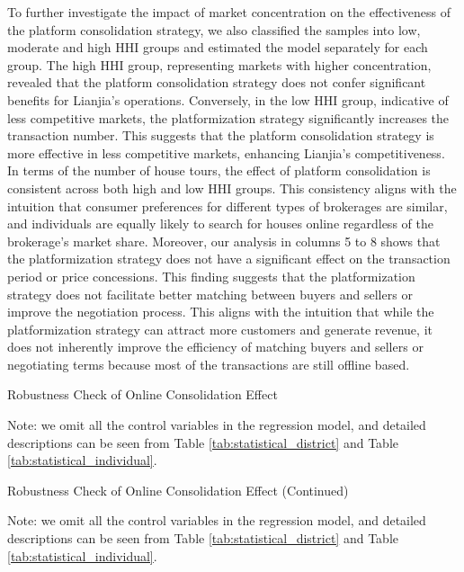 \documentclass[11pt]{article}
\begin{document}
To further investigate the impact of market concentration on the effectiveness of the platform consolidation strategy, we also classified the samples into low, moderate and high HHI groups and estimated the model separately for each group. The high HHI group, representing markets with higher concentration, revealed that the platform consolidation strategy does not confer significant benefits for Lianjia's operations. Conversely, in the low HHI group, indicative of less competitive markets, the platformization strategy significantly increases the transaction number. This suggests that the platform consolidation strategy is more effective in less competitive markets, enhancing Lianjia's competitiveness. In terms of the number of house tours, the effect of platform consolidation is consistent across both high and low HHI groups. This consistency aligns with the intuition that consumer preferences for different types of brokerages are similar, and individuals are equally likely to search for houses online regardless of the brokerage's market share. Moreover, our analysis in columns 5 to 8 shows that the platformization strategy does not have a significant effect on the transaction period or price concessions. This finding suggests that the platformization strategy does not facilitate better matching between buyers and sellers or improve the negotiation process. This aligns with the intuition that while the platformization strategy can attract more customers and generate revenue, it does not inherently improve the efficiency of matching buyers and sellers or negotiating terms because most of the transactions are still offline based.

\begin{table}
  \begin{center}
    \begin{scriptsize}
      \caption{Robustness Check of Online Consolidation Effect}
      \label{tab:heter_platform_did}
      
    
    Note: we omit all the control variables in the regression model, and detailed descriptions can be seen from Table \ref{tab:statistical_district} and Table \ref{tab:statistical_individual}.
    \end{scriptsize}
  \end{center}
\end{table}

\begin{table}
  \begin{center}
    \begin{scriptsize}
      \caption{Robustness Check of Online Consolidation Effect (Continued)}
      \label{tab:heter_platform_did}
      
    
    Note: we omit all the control variables in the regression model, and detailed descriptions can be seen from Table \ref{tab:statistical_district} and Table \ref{tab:statistical_individual}.
    \end{scriptsize}
  \end{center}
\end{table}
\end{document}
